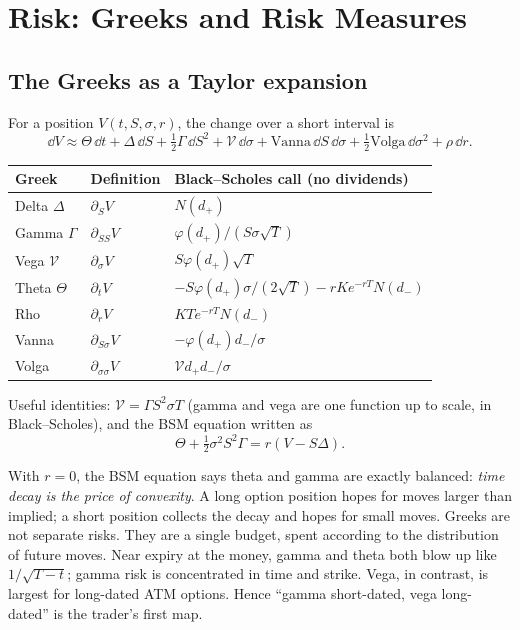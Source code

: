 \chapter{Risk: Greeks and Risk Measures}\label{ch:risk}

\section{The Greeks as a Taylor expansion}

For a position $V(t,S,\sigma,r)$, the change over a short interval is
\[
\dd V\approx\Theta\,\dd t+\Delta\,\dd S+\tfrac12\Gamma\,\dd S^2+\mathcal{V}\,\dd\sigma+\text{Vanna}\,\dd S\,\dd\sigma+\tfrac12\text{Volga}\,\dd\sigma^2+\rho\,\dd r.
\]
\begin{center}
\small
\begin{tabular}{lll}
\toprule
Greek & Definition & Black--Scholes call (no dividends)\\
\midrule
Delta $\Delta$ & $\partial_SV$ & $N(d_+)$\\
Gamma $\Gamma$ & $\partial_{SS}V$ & $\varphi(d_+)/(S\sigma\sqrt T)$\\
Vega $\mathcal{V}$ & $\partial_\sigma V$ & $S\varphi(d_+)\sqrt T$\\
Theta $\Theta$ & $\partial_tV$ & $-S\varphi(d_+)\sigma/(2\sqrt T)-rKe^{-rT}N(d_-)$\\
Rho & $\partial_rV$ & $KTe^{-rT}N(d_-)$\\
Vanna & $\partial_{S\sigma}V$ & $-\varphi(d_+)d_-/\sigma$\\
Volga & $\partial_{\sigma\sigma}V$ & $\mathcal{V}d_+d_-/\sigma$\\
\bottomrule
\end{tabular}
\end{center}

Useful identities: $\mathcal{V}=\Gamma S^2\sigma T$ (gamma and vega are one function up to scale, in Black--Scholes), and the BSM equation written as
\[
\Theta+\tfrac12\sigma^2S^2\Gamma=r(V-S\Delta).
\]
\begin{intuition}
With $r=0$, the BSM equation says theta and gamma are exactly balanced: \emph{time decay is the price of convexity}. A long option position hopes for moves larger than implied; a short position collects the decay and hopes for small moves. Greeks are not separate risks. They are a single budget, spent according to the distribution of future moves. Near expiry at the money, gamma and theta both blow up like $1/\sqrt{T-t}$; gamma risk is concentrated in time and strike. Vega, in contrast, is largest for long-dated ATM options. Hence ``gamma short-dated, vega long-dated'' is the trader's first map.
\end{intuition}

